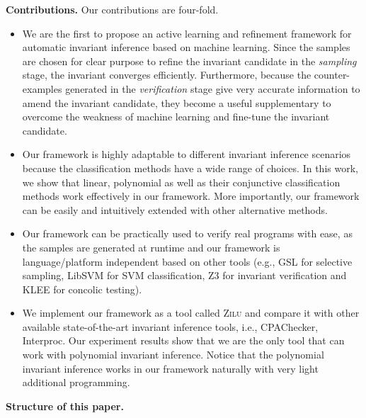 \medskip\noindent
\textbf{Contributions.}
Our contributions are four-fold. 
\begin{itemize}
    \item 
    We are the first to propose an active learning and refinement framework 
    for automatic invariant inference based on machine learning. 
    Since the samples are chosen for clear purpose 
    to refine the invariant candidate in the \emph{sampling} stage, 
    the invariant converges efficiently. 
    Furthermore, because the counter-examples generated in the \emph{verification} stage 
    give very accurate information to amend the invariant candidate, 
    they become a useful supplementary to overcome the weakness of machine learning 
    and fine-tune the invariant candidate. 
    \item 
    Our framework is highly adaptable to different invariant inference scenarios 
    because the classification methods have a wide range of choices. 
    In this work, we show that linear, polynomial as well as 
    their conjunctive classification methods work effectively in our framework. 
    More importantly, our framework can be easily and intuitively extended with other alternative methods. 
    \item 
    Our framework can be practically used to verify real programs with ease, 
    as the samples are generated at runtime 
    and our framework is language/platform independent based on other tools 
    (e.g., GSL for selective sampling, LibSVM for SVM classification, 
    Z3 for invariant verification and KLEE for concolic testing). 
    \item 
    We implement our framework as a tool called \textsc{Zilu} 
    and compare it with other available state-of-the-art invariant inference tools, 
    i.e., CPAChecker, Interproc. 
    Our experiment results show that 
    we are the only tool that can work with polynomial invariant inference. 
    Notice that the polynomial invariant inference works in our framework 
    naturally with very light additional programming. 
\end{itemize}

\medskip\noindent
\textbf{Structure of this paper.}


